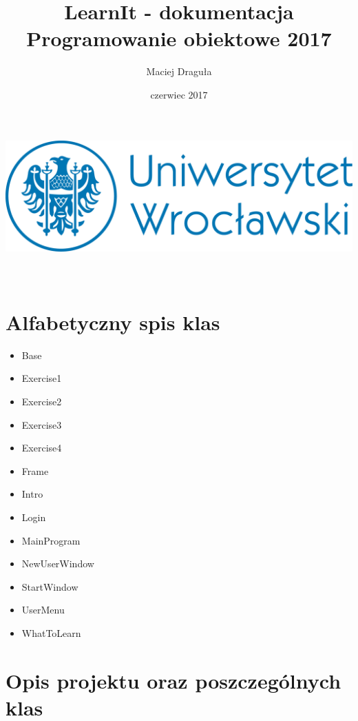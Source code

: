 \documentclass[11pt]{article}
\title{LearnIt - dokumentacja \\ \large Programowanie obiektowe 2017}
\author{Maciej Draguła}
\date{czerwiec 2017}
\begin{document}
\makeatletter
    \begin{titlepage}
        \begin{center}
            \includegraphics[width=0.7\linewidth]{UWr.png}\\[10ex]
            {\huge \bfseries  \@title }\\[6ex] 
            {\LARGE  \@author}\\[50ex] 
            {\large \@date}
        \end{center}
    \end{titlepage}
\makeatother
\thispagestyle{empty}
\newpage


\section{Alfabetyczny spis klas}
\begin{itemize}
	\item Base
	\item Exercise1
	\item Exercise2
	\item Exercise3
	\item Exercise4
	\item Frame
	\item Intro
	\item Login
	\item MainProgram
	\item NewUserWindow
	\item StartWindow
	\item UserMenu
	\item WhatToLearn
\end{itemize}

\section{Opis projektu oraz poszczególnych klas}
\end{document}
